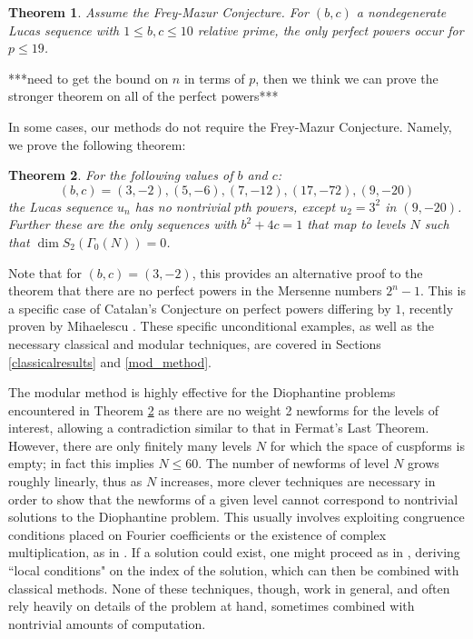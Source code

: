 \documentclass[12pt]{amsart}
\newtheorem{ithm}{Theorem}
\theoremstyle{definition}
\begin{document}
\begin{ithm}\label{cond_ex}
Assume the Frey-Mazur Conjecture.  For $(b,c)$ a nondegenerate Lucas sequence with $1 \leq b,c \leq 10$ relative prime, the only perfect powers occur for $p \leq 19$.
\end{ithm}

***need to get the bound on $n$ in terms of $p$, then we think we can prove the stronger theorem on all of the perfect powers***


In some cases, our methods do not require the Frey-Mazur Conjecture.  Namely, we prove the following theorem:

\begin{ithm}\label{explicit_eg_thm}
For the following values of $b$ and $c$:
\begin{equation}\label{examples} (b,c) = (3,-2), (5,-6), (7,-12), (17,-72), (9,-20) \end{equation}
the Lucas sequence $u_n$ has no nontrivial $p$th powers, except $u_2 = 3^2$ in $(9,-20)$.  Further these are the only sequences with $b^2+4c = 1$ that map to levels $N$ such that $\dim S_2(\Gamma_0(N)) = 0$.
\end{ithm}

Note that for $(b,c) = (3,-2)$, this provides an alternative proof to the theorem that there are no perfect powers in the Mersenne numbers $2^n - 1$.  This is a specific case of Catalan's Conjecture on perfect powers differing by $1$, recently proven by Mihaelescu \cite{mih04}.  These specific unconditional examples, as well as the necessary classical and modular techniques, are covered in Sections \ref{classicalresults} and \ref{mod_method}.

The modular method is highly effective for the Diophantine problems encountered in Theorem \ref{explicit_eg_thm} as there are no weight 2 newforms for the levels of interest, allowing a contradiction similar to that in Fermat's Last Theorem.  However, there are only finitely many levels $N$ for which the space of cuspforms is empty; in fact this implies $N \leq 60$.  The number of newforms of level $N$ grows roughly linearly, thus as $N$ increases, more clever techniques are necessary in order to show that the newforms of a given level cannot correspond to nontrivial solutions to the Diophantine problem.  This usually involves exploiting congruence conditions placed on Fourier coefficients or the existence of complex multiplication, as in \cite{bennett04}.  If a solution could exist, one might proceed as in \cite{siksek06}, deriving ``local conditions" on the index of the solution, which can then be combined with classical methods.  None of these techniques, though, work in general, and often rely heavily on details of the problem at hand, sometimes combined with nontrivial amounts of computation.
\end{document}
